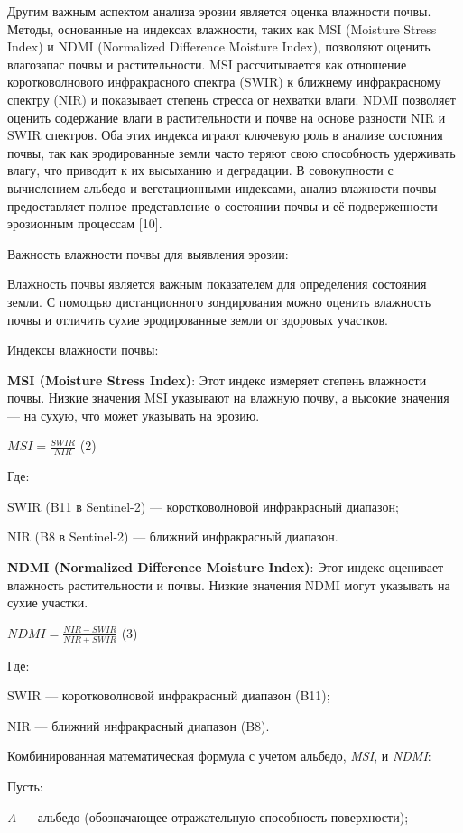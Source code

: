 Другим важным аспектом анализа эрозии является оценка влажности
почвы. Методы, основанные на индексах влажности, таких как MSI
(Moisture Stress Index) и NDMI (Normalized Difference Moisture Index),
позволяют оценить влагозапас почвы и растительности. MSI рассчитывается
как отношение коротковолнового инфракрасного спектра (SWIR) к ближнему
инфракрасному спектру (NIR) и показывает степень стресса от нехватки
влаги. NDMI позволяет оценить содержание влаги в растительности и почве
на основе разности NIR и SWIR спектров. Оба этих индекса играют ключевую
роль в анализе состояния почвы, так как эродированные земли часто теряют
свою способность удерживать влагу, что приводит к их высыханию и
деградации. В совокупности с вычислением альбедо и вегетационными
индексами, анализ влажности почвы предоставляет полное представление о
состоянии почвы и её подверженности эрозионным процессам {[}10{]}.

Важность влажности почвы для выявления эрозии:

Влажность почвы является важным показателем для определения состояния
земли. С помощью дистанционного зондирования можно оценить влажность
почвы и отличить сухие эродированные земли от здоровых участков.

Индексы влажности почвы:

{\bfseries MSI (Moisture Stress Index)}: Этот индекс измеряет степень
влажности почвы. Низкие значения MSI указывают на влажную почву, а
высокие значения --- на сухую, что может указывать на эрозию.

\(MSI = \frac{SWIR}{NIR}\) (2)

Где:

SWIR (B11 в Sentinel-2) --- коротковолновой инфракрасный диапазон;

NIR (B8 в Sentinel-2) --- ближний инфракрасный диапазон.

{\bfseries NDMI (Normalized Difference Moisture Index)}: Этот индекс
оценивает влажность растительности и почвы. Низкие значения NDMI могут
указывать на сухие участки.

\(NDMI = \frac{NIR - SWIR}{NIR + SWIR}\) (3)

Где:

SWIR --- коротковолновой инфракрасный диапазон (B11);

NIR --- ближний инфракрасный диапазон (B8).

Комбинированная математическая формула с учетом альбедо, \emph{MSI}, и
\emph{NDMI}:

Пусть:

\emph{A} --- альбедо (обозначающее отражательную способность
поверхности);


